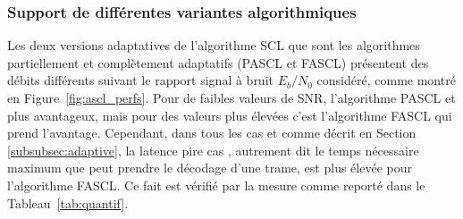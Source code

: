   \begin{table}[t]
    \renewcommand{\arraystretch}{1.1}
    \centering
    \caption{Comparaison de débits et latences des algotihmes SCL adaptatifs pour des représentations en virgule flottante (32 bits) et virgule fixe (16 et 8 bits). Code polaire ($2048$,$1723$), $L=32$, CRC $c=32$ (GZip)}
    \label{tab:quantif}
    {\small{}}
  \end{table}

\subsubsection{Support de différentes variantes algorithmiques}
Les deux versions adaptatives de l'algorithme SCL que sont les algorithmes partiellement et complètement adaptatifs (PASCL et FASCL) présentent des débits différents suivant le rapport signal à bruit $E_b/N_0$ considéré, comme montré en Figure~\ref{fig:ascl_perfs}. Pour de faibles valeurs de SNR, l'algorithme PASCL et plus avantageux, mais pour des valeurs plus élevées c'est l'algorithme FASCL qui prend l'avantage. Cependant, dans tous les cas et comme décrit en Section \ref{subsubsec:adaptive}, la latence \og pire cas \fg, autrement dit le temps nécessaire maximum que peut prendre le décodage d'une trame, est plus élevée pour l'algorithme FASCL. Ce fait est vérifié par la mesure comme reporté dans le Tableau~\ref{tab:quantif}.

